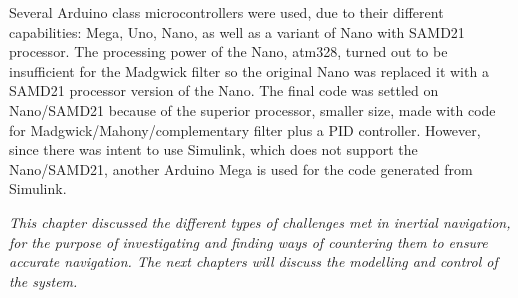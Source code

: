  
Several Arduino class microcontrollers were used, due to their different capabilities: Mega, Uno, Nano, as well as a variant of Nano with SAMD21 processor. The processing power of the Nano, atm328, turned out to be insufficient for the Madgwick filter so the original Nano was replaced it with a SAMD21 processor version of the Nano. The final code was settled on Nano/SAMD21 because of the superior processor, smaller size, made with code for Madgwick/Mahony/complementary filter plus a PID controller. However, since there was intent to use Simulink, which does not support the Nano/SAMD21, another Arduino Mega is used for the code generated from Simulink. 
 
 \textit{This chapter discussed the different types of challenges met in inertial navigation, for the purpose of investigating and finding ways of countering them to ensure accurate navigation. 
The next chapters will discuss the modelling and control of the system.}



